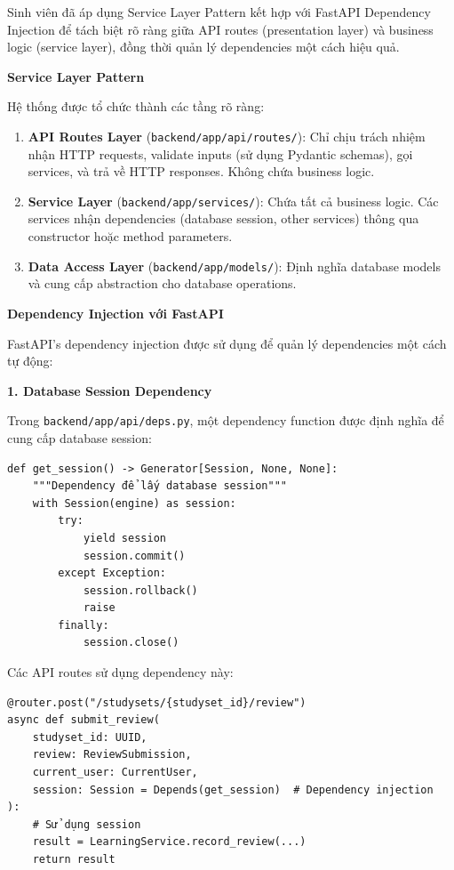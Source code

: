 \documentclass[../DoAn.tex]{subfiles}
\begin{document}
Sinh viên đã áp dụng Service Layer Pattern kết hợp với FastAPI Dependency Injection để tách biệt rõ ràng giữa API routes (presentation layer) và business logic (service layer), đồng thời quản lý dependencies một cách hiệu quả.

\textbf{Service Layer Pattern}

Hệ thống được tổ chức thành các tầng rõ ràng:

\begin{enumerate}
    \item \textbf{API Routes Layer} (\texttt{backend/app/api/routes/}): Chỉ chịu trách nhiệm nhận HTTP requests, validate inputs (sử dụng Pydantic schemas), gọi services, và trả về HTTP responses. Không chứa business logic.
    
    \item \textbf{Service Layer} (\texttt{backend/app/services/}): Chứa tất cả business logic. Các services nhận dependencies (database session, other services) thông qua constructor hoặc method parameters.
    
    \item \textbf{Data Access Layer} (\texttt{backend/app/models/}): Định nghĩa database models và cung cấp abstraction cho database operations.
\end{enumerate}

\textbf{Dependency Injection với FastAPI}

FastAPI's dependency injection được sử dụng để quản lý dependencies một cách tự động:

\textbf{1. Database Session Dependency}

Trong \texttt{backend/app/api/deps.py}, một dependency function được định nghĩa để cung cấp database session:

\begin{verbatim}
def get_session() -> Generator[Session, None, None]:
    """Dependency để lấy database session"""
    with Session(engine) as session:
        try:
            yield session
            session.commit()
        except Exception:
            session.rollback()
            raise
        finally:
            session.close()
\end{verbatim}

Các API routes sử dụng dependency này:

\begin{verbatim}
@router.post("/studysets/{studyset_id}/review")
async def submit_review(
    studyset_id: UUID,
    review: ReviewSubmission,
    current_user: CurrentUser,
    session: Session = Depends(get_session)  # Dependency injection
):
    # Sử dụng session
    result = LearningService.record_review(...)
    return result
\end{verbatim}
\end{document}
